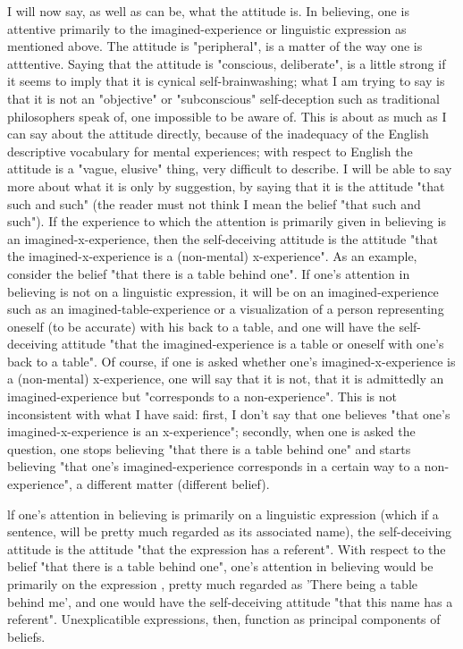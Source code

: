 \documentclass[10pt,twoside]{memoir}
\begin{document}
\begin{enumerate}
{I will now say, as well as can be, what the attitude is. In believing, one 
is attentive primarily to the imagined-experience or linguistic expression as 
mentioned above. The attitude is "peripheral", is a matter of the way one is 
atttentive. Saying that the attitude is "conscious, deliberate", is a little 
strong if it seems to imply that it is cynical self-brainwashing; what I am 
trying to say is that it is not an "objective" or "subconscious" self-deception 
such as traditional philosophers speak of, one impossible to be aware of. This 
is about as much as I can say about the attitude directly, because of the 
inadequacy of the English descriptive vocabulary for mental experiences; 
with respect to English the attitude is a "vague, elusive" thing, very difficult 
to describe. I will be able to say more about what it is only by suggestion, by 
saying that it is the attitude "that such and such" (the reader must not think 
I mean the belief "that such and such"). If the experience to which the 
attention is primarily given in believing is an imagined-x-experience, then the 
self-deceiving attitude is the attitude "that the imagined-x-experience is a 
(non-mental) x-experience". As an example, consider the belief "that there is 
a table behind one". If one's attention in believing is not on a linguistic 
expression, it will be on an imagined-experience such as an 
imagined-table-experience or a visualization of a person representing oneself 
(to be accurate) with his back to a table, and one will have the self-deceiving 
attitude "that the imagined-experience is a table or oneself with one's back 
to a table". Of course, if one is asked whether one's imagined-x-experience is 
a (non-mental) x-experience, one will say that it is not, that it is admittedly 
an imagined-experience but "corresponds to a non-experience". This is not 
inconsistent with what I have said: first, I don't say that one believes "that 
one's imagined-x-experience is an x-experience"; secondly, when one is asked 
the question, one stops believing "that there is a table behind one" and starts 
believing "that one's imagined-experience corresponds in a certain way to a 
non-experience", a different matter (different belief). 

lf one's attention in believing is primarily on a linguistic expression 
(which if a sentence, will be pretty much regarded as its associated name), 
the self-deceiving attitude is the attitude "that the expression has a 
referent". With respect to the belief "that there is a table behind one", one's 
attention in believing would be primarily on the expression , pretty much regarded as 'There being a table behind me', and 
one would have the self-deceiving attitude "that this name has a referent". 
Unexplicatible expressions, then, function as principal components of 
beliefs. 

}
\end{enumerate}
\end{document}
